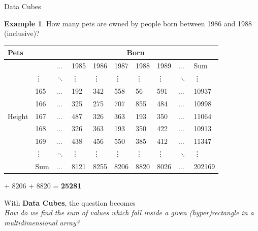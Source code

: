 \documentclass{beamer}
\theoremstyle{definition}
\newtheorem{myexample}{Example}
\theoremstyle{definition}
\newcommand{\graycell}{\cellcolor[gray]{0.8}}
\begin{document}
\begin{frame}{Data Cubes}
    \begin{myexample}
        How many pets are owned by people born between 1986 and 1988 (inclusive)?
    \end{myexample}

    \begin{table}[h]\footnotesize
        \begin{tabular} { | l | l | l | l | l | l | l | l | l | l |}
        \hline
        \textbf{Pets} & & \multicolumn{8}{|c|}{Born} \\ \hline
        & & $\hdots$ & 1985 & 1986 & 1987 & 1988 & 1989 & $\hdots$ & Sum \\ \hline
        \multirow{7}{*}{Height}
        & \vdots & $\ddots$ & \vdots & \vdots & \vdots & \vdots & \vdots & $\ddots$ & \vdots \\
        & 165 & $\hdots$ & 192 & 342 & 558 & 56 & 591 & $\hdots$ & 10937 \\
        & 166 & $\hdots$ & 325 & 275 & 707 & 855 & 484 & $\hdots$ & 10998 \\
        & 167 & $\hdots$ & 487 & 326 & 363 & 193 & 350 & $\hdots$ & 11064 \\
        & 168 & $\hdots$ & 326 & 363 & 193 & 350 & 422 & $\hdots$ & 10913 \\
        & 169 & $\hdots$ & 438 & 456 & 550 & 385 & 412 & $\hdots$ & 11347 \\
        & \vdots & $\ddots$ & \vdots & \vdots & \vdots & \vdots & \vdots & $\ddots$ & \vdots \\
        & Sum & $\hdots$ & 8121 & \graycell 8255 & \graycell 8206  & \graycell 8820 & 8026 & $\hdots$ & 202169 \\
        \hline
        \end{tabular}
    \end{table}
     + 8206 + 8820 = \textbf{25281}
\end{frame}

\begin{frame}
    With \textbf{Data Cubes}, the question becomes \\
    \textit{How do we find the sum of values which fall inside a given (hyper)rectangle in a multidimensional array?}
\end{frame}
\end{document}
